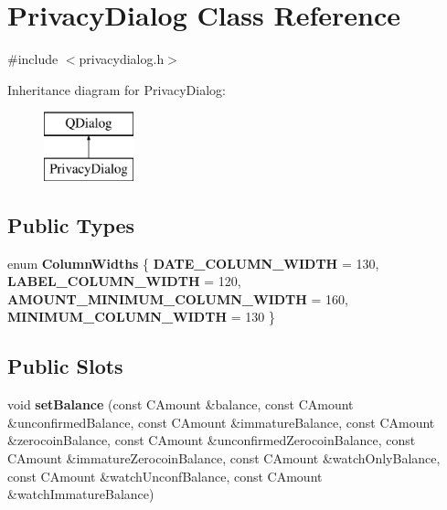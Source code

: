 \hypertarget{class_privacy_dialog}{}\section{Privacy\+Dialog Class Reference}
\label{class_privacy_dialog}


{\ttfamily \#include $<$privacydialog.\+h$>$}

Inheritance diagram for Privacy\+Dialog\+:\begin{figure}[H]
\begin{center}
\leavevmode
\includegraphics[height=2.000000cm]{class_privacy_dialog}
\end{center}
\end{figure}
\subsection*{Public Types}
\begin{DoxyCompactItemize}
\item 
\mbox{\label{class_privacy_dialog_a768548ddf39161a6404baa8bbd2fccd5}} 
enum {\bfseries Column\+Widths} \{ {\bfseries D\+A\+T\+E\+\_\+\+C\+O\+L\+U\+M\+N\+\_\+\+W\+I\+D\+TH} = 130, 
{\bfseries L\+A\+B\+E\+L\+\_\+\+C\+O\+L\+U\+M\+N\+\_\+\+W\+I\+D\+TH} = 120, 
{\bfseries A\+M\+O\+U\+N\+T\+\_\+\+M\+I\+N\+I\+M\+U\+M\+\_\+\+C\+O\+L\+U\+M\+N\+\_\+\+W\+I\+D\+TH} = 160, 
{\bfseries M\+I\+N\+I\+M\+U\+M\+\_\+\+C\+O\+L\+U\+M\+N\+\_\+\+W\+I\+D\+TH} = 130
 \}
\end{DoxyCompactItemize}
\subsection*{Public Slots}
\begin{DoxyCompactItemize}
\item 
\mbox{\label{class_privacy_dialog_aa2421362d12b1cbf7dd8d6412de5c018}} 
void {\bfseries set\+Balance} (const C\+Amount \&balance, const C\+Amount \&unconfirmed\+Balance, const C\+Amount \&immature\+Balance, const C\+Amount \&zerocoin\+Balance, const C\+Amount \&unconfirmed\+Zerocoin\+Balance, const C\+Amount \&immature\+Zerocoin\+Balance, const C\+Amount \&watch\+Only\+Balance, const C\+Amount \&watch\+Unconf\+Balance, const C\+Amount \&watch\+Immature\+Balance)
\end{DoxyCompactItemize}
